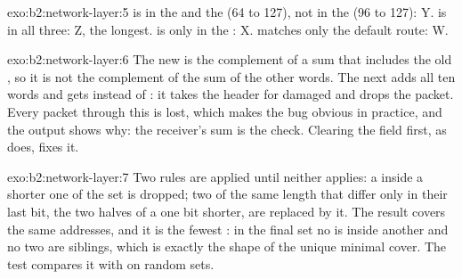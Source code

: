 \begin{solution}{exo:b2:network-layer:5}
 is in the  and the  (64 to 127), not in the  (96 to 127): Y.
 is in all three: Z, the longest.  is only in the : X.
 matches only the default route: W.
\end{solution}

\begin{solution}{exo:b2:network-layer:6}
The new  is the complement of a sum that includes the old , so it is not the complement of the sum of
the other words. The next  adds all ten words and gets  instead of : it takes the header
for damaged and drops the packet. Every packet through this  is lost, which makes the bug obvious in practice,
and the output shows why: the receiver's sum is the check. Clearing the field first, as  does, fixes it.
\end{solution}

\begin{solution}{exo:b2:network-layer:7}
Two rules are applied until neither applies: a  inside a shorter one of the set is dropped; two  of the
same length that differ only in their last bit, the two halves of a  one bit shorter, are replaced by it. The
result covers the same addresses, and it is the fewest : in the final set no  is inside another and no
two are siblings, which is exactly the shape of the unique minimal cover. The test compares it with
 on random sets.
\end{solution}

